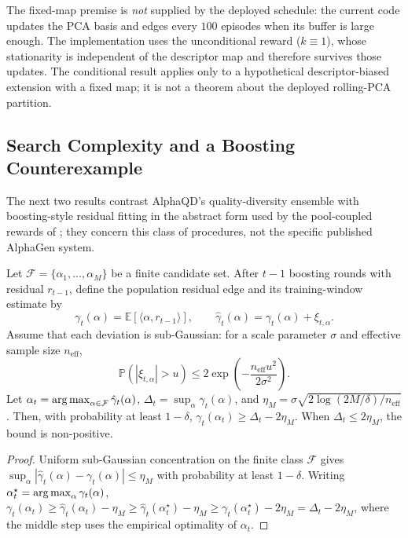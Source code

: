 The fixed-map premise is \emph{not} supplied by the deployed schedule: the current code updates the PCA basis and edges every $100$ episodes when its buffer is large enough. The implementation uses the unconditional reward ($k\equiv 1$), whose stationarity is independent of the descriptor map and therefore survives those updates. The conditional result applies only to a hypothetical descriptor-biased extension with a fixed map; it is not a theorem about the deployed rolling-PCA partition.

\subsection{Search Complexity and a Boosting Counterexample}
\label{sec:alphaqd_complexity}

The next two results contrast AlphaQD's quality-diversity ensemble with boosting-style residual fitting in the abstract form used by the pool-coupled rewards of ; they concern this class of procedures, not the specific published AlphaGen system.

\begin{theorem}
\label{thm:alphaqd_boost}
Let $\mathcal{F}=\{\alpha_1,\dots,\alpha_M\}$ be a finite candidate set. After $t-1$ boosting rounds with residual $r_{t-1}$, define the population residual edge and its training-window estimate by
\[
\gamma_t(\alpha)=\mathbb{E}[\langle\alpha,r_{t-1}\rangle],
\qquad
\hat\gamma_t(\alpha)=\gamma_t(\alpha)+\xi_{t,\alpha}.
\]
Assume that each deviation is sub-Gaussian: for a scale parameter $\sigma$ and effective sample size $n_{\mathrm{eff}}$,
\[
\mathbb{P}(|\xi_{t,\alpha}|>u)
\le 2\exp\!\left(-\frac{n_{\mathrm{eff}}u^2}{2\sigma^2}\right).
\]
Let $\alpha_t=\operatorname*{arg\,max}_{\alpha\in\mathcal{F}}\hat\gamma_t(\alpha)$, $\Delta_t=\sup_\alpha\gamma_t(\alpha)$, and $\eta_M=\sigma\sqrt{2\log(2M/\delta)/n_{\mathrm{eff}}}$. Then, with probability at least $1-\delta$, $\gamma_t(\alpha_t)\ge\Delta_t-2\eta_M$. When $\Delta_t\le 2\eta_M$, the bound is non-positive.
\end{theorem}
\begin{proof}
Uniform sub-Gaussian concentration on the finite class $\mathcal{F}$ gives $\sup_\alpha|\hat\gamma_t(\alpha)-\gamma_t(\alpha)|\le\eta_M$ with probability at least $1-\delta$. Writing $\alpha_t^\star=\operatorname*{arg\,max}_\alpha\gamma_t(\alpha)$, $\gamma_t(\alpha_t)\ge\hat\gamma_t(\alpha_t)-\eta_M\ge\hat\gamma_t(\alpha_t^\star)-\eta_M\ge\gamma_t(\alpha_t^\star)-2\eta_M=\Delta_t-2\eta_M$, where the middle step uses the empirical optimality of $\alpha_t$.
\end{proof}


